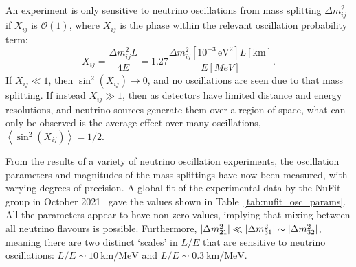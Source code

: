 An experiment is only sensitive to neutrino oscillations from mass splitting $\Delta m^{2}_{ij}$ if $X_{ij}$ is $\mathcal{O}(1)$, where $X_{ij}$ is the phase within the relevant oscillation probability term:
\begin{equation}\label{eq:nu_osc_phase}
    X_{ij} = \frac{\Delta m^{2}_{ij} L}{4E} = 1.27 \frac{\Delta m^{2}_{ij} [10^{-3}\,\si{\eV\squared}] L [\si{\km}]}{E [\si{MeV}]}.
\end{equation}
If $X_{ij}\ll 1$, then $\sin^{2}\left(X_{ij}\right)\to 0$, and no oscillations are seen due to that mass splitting. If instead $X_{ij}\gg 1$, then as detectors have limited distance and energy resolutions, and neutrino sources generate them over a region of space, what can only be observed is the average effect over many oscillations, $\left<\sin^{2}\left(X_{ij}\right)\right> = 1/2$.

From the results of a variety of neutrino oscillation experiments, the oscillation parameters and magnitudes of the mass splittings have now been measured, with varying degrees of precision. A global fit of the experimental data by the NuFit group in October 2021~\cite{estebanFateHintsUpdated2020} gave the values shown in Table~\ref{tab:nufit_osc_params}. All the parameters appear to have non-zero values, implying that mixing between all neutrino flavours is possible. Furthermore, $|\Delta m^{2}_{21}{}|\ll|\Delta m^{2}_{31}|\sim|\Delta m^{2}_{32}|$, meaning there are two distinct `scales' in $L/E$ that are sensitive to neutrino oscillations: $L/E\sim\SI{10}{\km\per\MeV}$ and $L/E\sim\SI{0.3}{\km\per\MeV}.$

